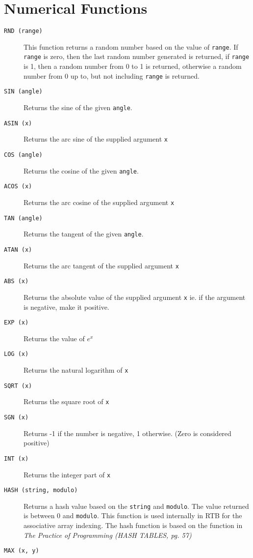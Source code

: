 \chapter{Numerical Functions}

\begin{description}
\item[{\tt RND (range)}]
This function returns a random number based on the value of {\tt range}.
If {\tt range} is zero, then the last random number generated is returned,
if {\tt range} is 1, then a random number from 0 to 1 is returned,
otherwise a random number from 0 up to, but not including {\tt range}
is returned.
\item[{\tt SIN (angle)}]
Returns the sine of the given {\tt angle}.
\item[{\tt ASIN (x)}]
Returns the arc sine of the supplied argument {\tt x}
\item[{\tt COS (angle)}]
Returns the cosine of the given {\tt angle}.
\item[{\tt ACOS (x)}]
Returns the arc cosine of the supplied argument {\tt x}
\item[{\tt TAN (angle)}]
Returns the tangent of the given {\tt angle}.
\item[{\tt ATAN (x)}]
Returns the arc tangent of the supplied argument {\tt x}
\item[{\tt ABS (x)}]
Returns the absolute value of the supplied argument {\tt x} ie. if the
argument is negative, make it positive.
\item[{\tt EXP (x)}]
Returns the value of $e^x$
\item[{\tt LOG (x)}]
Returns the natural logarithm of {\tt x}
\item[{\tt SQRT (x)}]
Returns the square root of {\tt x}
\item[{\tt SGN (x)}]
Returns -1 if the number is negative, 1 otherwise. (Zero is considered
positive)
\item[{\tt INT (x)}]
Returns the integer part of {\tt x}
\item[{\tt HASH (string, modulo)}]
Returns a hash value based on the {\tt string} and {\tt modulo}. The
value returned is between 0 and {\tt modulo}. This function is used
internally in RTB for the associative array indexing. The hash function
is based on the function in {\em The Practice of Programming (HASH TABLES,
pg. 57)}
\item[{\tt MAX (x, y)}]

\end{description}
